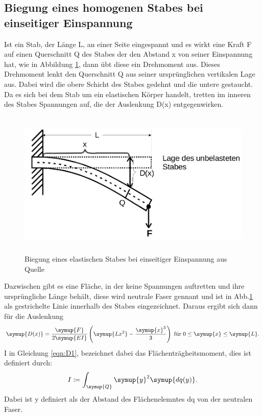 \subsection{Biegung eines homogenen Stabes bei einseitiger Einspannung}
\label{sec:T1}
Ist ein Stab, der Länge L, an einer Seite eingespannt und es wirkt eine Kraft F
auf einen
Querschnitt Q des Stabes der den Abstand x von seiner Einspannung hat, wie in
Abbildung \ref{fig:abb2}, dann übt diese ein Drehmoment aus. Dieses Drehmoment
lenkt den Querschnitt Q aus seiner ursprünglichen vertikalen Lage aus. Dabei
wird die obere Schicht des Stabes gedehnt und die untere gestaucht. Da es sich
bei dem Stab um ein elastischen Körper handelt, tretten im inneren des Stabes
Spannungen auf, die der Auslenkung D(x) entgegenwirken.
\begin{figure}
  \centering
  \includegraphics[height = 7cm]{logos/Abb2.png}
  \caption{Biegung eines elastischen Stabes bei einseitiger Einspannung
  aus Quelle \cite{Anleitung}}
  \label{fig:abb2}
\end{figure}
\FloatBarrier
Dazwischen gibt es eine Fläche, in der keine Spannungen auftretten und ihre
ursprüngliche Länge behält, diese wird neutrale Faser gennant und ist in
Abb.\ref{fig:abb2} als gestrichelte Linie innerhalb des Stabes eingezeichnet.
Daraus ergibt sich dann für die Auslenkung
\begin{equation}
  \symup{D(x)} = \frac{\symup{F}}{2\symup{EI}} \left(\symup{Lx^2}-
  \frac{\symup{x}^3}{3}\right) \; \text{für} \; 0 \leq \symup{x} \leq \symup{L}.
  \label{eqn:D1}
\end{equation}
I in Gleichung \eqref{eqn:D1}, bezeichnet dabei das Flächenträgheitsmoment, dies
ist definiert durch:
\begin{equation}
  I \coloneq \int_{\symup{Q}}\symup{y}^2\symup{dq(y)}.
  \label{eqn:I}
\end{equation}
Dabei ist y definiert als der Abstand des Flächenelemntes dq von der neutralen
Faser.
